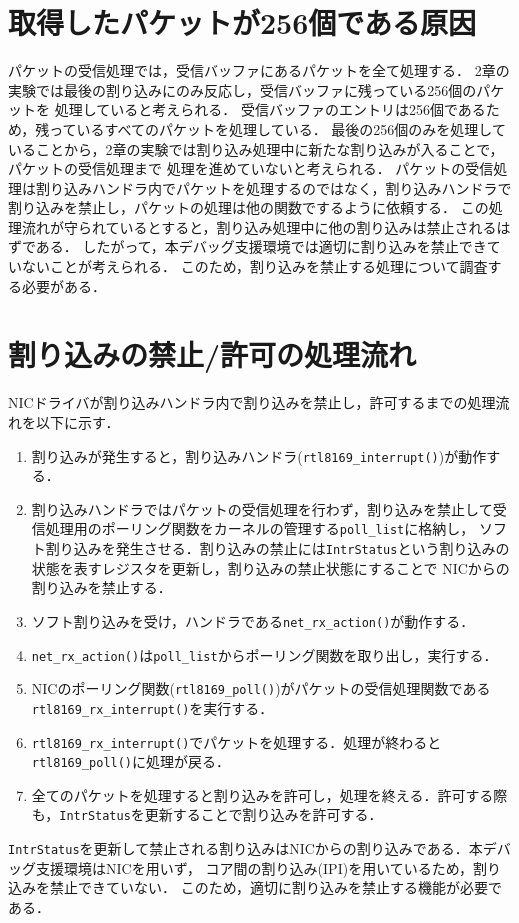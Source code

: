 \documentclass[12pt]{jsarticle}
\begin{document}
\section{取得したパケットが256個である原因}
パケットの受信処理では，受信バッファにあるパケットを全て処理する．
2章の実験では最後の割り込みにのみ反応し，受信バッファに残っている256個のパケットを
処理していると考えられる．
受信バッファのエントリは256個であるため，残っているすべてのパケットを処理している．
最後の256個のみを処理していることから，2章の実験では割り込み処理中に新たな割り込みが入ることで，パケットの受信処理まで
処理を進めていないと考えられる．
パケットの受信処理は割り込みハンドラ内でパケットを処理するのではなく，割り込みハンドラで
割り込みを禁止し，パケットの処理は他の関数でするように依頼する．
この処理流れが守られているとすると，割り込み処理中に他の割り込みは禁止されるはずである．
したがって，本デバッグ支援環境では適切に割り込みを禁止できていないことが考えられる．
このため，割り込みを禁止する処理について調査する必要がある．

\section{割り込みの禁止/許可の処理流れ}
NICドライバが割り込みハンドラ内で割り込みを禁止し，許可するまでの処理流れを以下に示す．
\begin{enumerate}
    \item 割り込みが発生すると，割り込みハンドラ({\tt rtl8169\_interrupt()})が動作する．
    \item 割り込みハンドラではパケットの受信処理を行わず，割り込みを禁止して受信処理用のポーリング関数をカーネルの管理する{\tt poll\_list}に格納し，
        ソフト割り込みを発生させる．割り込みの禁止には{\tt IntrStatus}という割り込みの状態を表すレジスタを更新し，割り込みの禁止状態にすることで
        NICからの割り込みを禁止する．
    \item ソフト割り込みを受け，ハンドラである{\tt net\_rx\_action()}が動作する．
    \item {\tt net\_rx\_action()}は{\tt poll\_list}からポーリング関数を取り出し，実行する．
    \item NICのポーリング関数({\tt rtl8169\_poll()})がパケットの受信処理関数である\\
        {\tt rtl8169\_rx\_interrupt()}を実行する．
    \item {\tt rtl8169\_rx\_interrupt()}でパケットを処理する．処理が終わると{\tt rtl8169\_poll()}に処理が戻る．
    \item 全てのパケットを処理すると割り込みを許可し，処理を終える．許可する際も，{\tt IntrStatus}を更新することで割り込みを許可する．
\end{enumerate}
{\tt IntrStatus}を更新して禁止される割り込みはNICからの割り込みである．本デバッグ支援環境はNICを用いず，
コア間の割り込み(IPI)を用いているため，割り込みを禁止できていない．
このため，適切に割り込みを禁止する機能が必要である．
\end{document}
